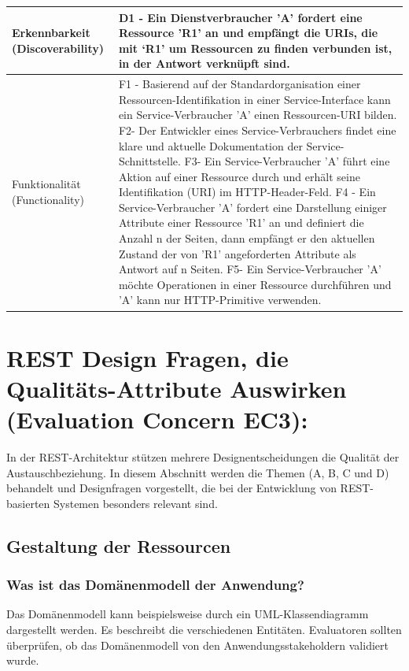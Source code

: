 \documentclass{acmsiggraph}
\begin{document}
\begin{center}
\begin{xtabular}{|C{2cm}|L{5,5cm}|}
 \\ 
    \hline
   Erkennbarkeit  (Discoverability) & 
     D1 - Ein Dienstverbraucher 'A' fordert eine Ressource 'R1' an und empfängt die URIs, die mit ‘R1’ um Ressourcen zu finden verbunden ist, in der Antwort verknüpft sind.
 \\ 
    \hline
     Funktionalität  (Functionality) & 
     F1 - Basierend auf der Standardorganisation einer Ressourcen-Identifikation in einer Service-Interface kann ein Service-Verbraucher 'A' einen Ressourcen-URI bilden.
F2- Der Entwickler eines Service-Verbrauchers findet eine klare und aktuelle Dokumentation der Service-Schnittstelle.
F3- Ein Service-Verbraucher 'A' führt eine Aktion auf einer Ressource durch und erhält seine Identifikation (URI) im HTTP-Header-Feld.
F4 - Ein Service-Verbraucher 'A' fordert eine Darstellung einiger Attribute einer Ressource 'R1' an und definiert die Anzahl n der Seiten, dann empfängt er den aktuellen Zustand der von 'R1' angeforderten Attribute als Antwort auf n Seiten.
F5- Ein Service-Verbraucher 'A' möchte Operationen in einer Ressource durchführen und 'A' kann nur HTTP-Primitive verwenden.
\\    
\hline

 \end{xtabular}
 \end{center}




\section{REST Design Fragen, die Qualitäts-Attribute Auswirken (Evaluation Concern EC3):}

In der REST-Architektur stützen mehrere Designentscheidungen die Qualität der Austauschbeziehung. In diesem Abschnitt werden die Themen (A, B, C und D) behandelt und Designfragen vorgestellt, die bei der Entwicklung von REST-basierten Systemen besonders relevant sind.

\subsection{Gestaltung der Ressourcen}
\subsubsection{Was ist das Domänenmodell der Anwendung?}
Das Domänenmodell kann beispielsweise durch ein UML-Klassendiagramm dargestellt werden. Es beschreibt die verschiedenen Entitäten. Evaluatoren sollten überprüfen, ob das Domänenmodell von den Anwendungsstakeholdern validiert wurde.
\end{document}
